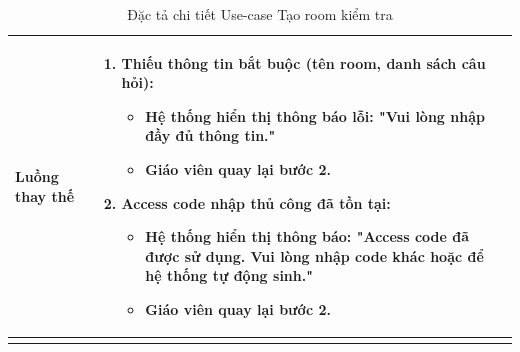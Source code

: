 \begin{longtable}{|p{}|p{}|}
\hline
\textbf{Luồng thay thế} &
\vspace{-\baselineskip}
\begin{enumerate}[topsep=2pt, itemsep=0pt]
    \item[2a.] Thiếu thông tin bắt buộc (tên room, danh sách câu hỏi):
    \begin{itemize}[topsep=0pt, itemsep=0pt]
        \item Hệ thống hiển thị thông báo lỗi: "Vui lòng nhập đầy đủ thông tin."
        \item Giáo viên quay lại bước 2.
    \end{itemize}
    \item[3a.] Access code nhập thủ công đã tồn tại:
    \begin{itemize}[topsep=0pt, itemsep=0pt]
        \item Hệ thống hiển thị thông báo: "Access code đã được sử dụng. Vui lòng nhập code khác hoặc để hệ thống tự động sinh."
        \item Giáo viên quay lại bước 2.
    \end{itemize}
\end{enumerate} \\
\hline
\caption{Đặc tả chi tiết Use-case Tạo room kiểm tra}
\label{table:uc-create-room}
\end{longtable}

\clearpage

